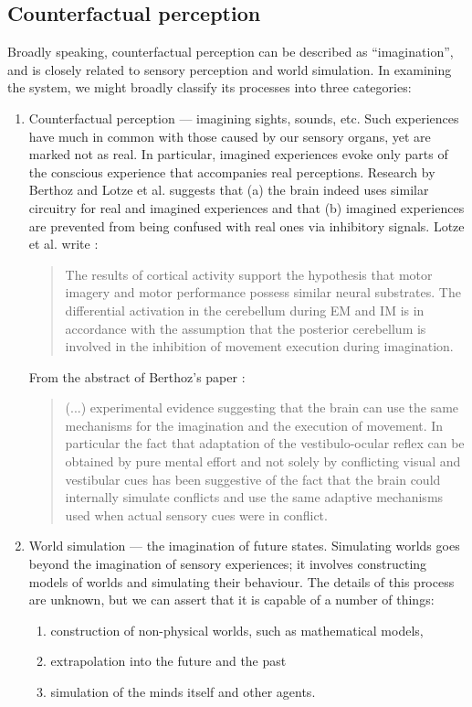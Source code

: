 \documentclass[]{scrartcl}
\begin{document}
\subsection{Counterfactual perception}

Broadly speaking, counterfactual perception can be described as ``imagination'', and is closely related to sensory perception and world simulation. In examining the system, we might broadly classify its processes into three categories:

\begin{enumerate}
	\item Counterfactual perception --- imagining sights, sounds, etc. Such experiences have much in common with those caused by our sensory organs, yet are marked not as real. In particular, imagined experiences evoke only parts of the conscious experience that accompanies real perceptions. Research by Berthoz and Lotze et al. suggests that (a) the brain indeed uses similar circuitry for real and imagined experiences and that (b) imagined experiences are prevented from being confused with real ones via inhibitory signals. Lotze et al. write \cite{lotze1999}:
	\begin{quote}
		The results of cortical activity support the hypothesis that motor imagery and motor performance possess similar neural substrates. The differential activation in the cerebellum during EM and IM is in accordance with the assumption that the posterior cerebellum is involved in the inhibition of movement execution during imagination.
	\end{quote}
	
	From the abstract of Berthoz's paper \cite{8713551}:
	
	\begin{quotation}
		(...) experimental evidence suggesting that the brain can use the same mechanisms for the imagination and the execution of movement. In particular the fact that adaptation of the vestibulo-ocular reflex can be obtained by pure mental effort and not solely by conflicting visual and vestibular cues has been suggestive of the fact that the brain could internally simulate conflicts and use the same adaptive mechanisms used when actual sensory cues were in conflict.
	\end{quotation}
	
	\item World simulation --- the imagination of future states. Simulating worlds goes beyond the imagination of sensory experiences; it involves constructing models of worlds and simulating their behaviour. The details of this process are unknown, but we can assert that it is capable of a number of things:
	\begin{enumerate}
		\item construction of non-physical worlds, such as mathematical models,
		\item extrapolation into the future and the past
		\item simulation of the minds itself and other agents.
	\end{enumerate}
	

\end{enumerate}
\end{document}
